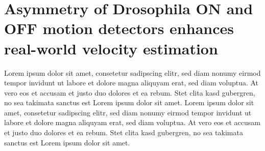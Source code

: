 \section{Asymmetry of Drosophila ON and OFF motion detectors enhances real-world velocity estimation}
\label{sct:manuscript_leonhardt}

Lorem ipsum dolor sit amet, consetetur sadipscing elitr, sed diam nonumy eirmod tempor invidunt ut labore et dolore magna aliquyam erat, sed diam voluptua. At vero eos et accusam et justo duo dolores et ea rebum. Stet clita kasd gubergren, no sea takimata sanctus est Lorem ipsum dolor sit amet. Lorem ipsum dolor sit amet, consetetur sadipscing elitr, sed diam nonumy eirmod tempor invidunt ut labore et dolore magna aliquyam erat, sed diam voluptua. At vero eos et accusam et justo duo dolores et ea rebum. Stet clita kasd gubergren, no sea takimata sanctus est Lorem ipsum dolor sit amet.

\cleardoublepage


